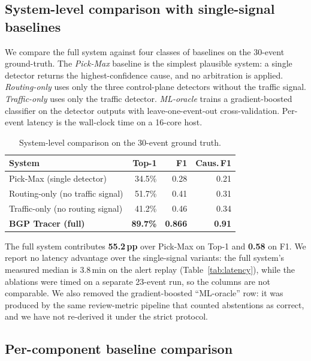 \subsection{System-level comparison with single-signal baselines}
We compare the full system against four classes of baselines on the 30-event ground-truth. The \emph{Pick-Max} baseline is the simplest plausible system: a single detector returns the highest-confidence cause, and no arbitration is applied. \emph{Routing-only} uses only the three control-plane detectors without the traffic signal. \emph{Traffic-only} uses only the traffic detector. \emph{ML-oracle} trains a gradient-boosted classifier on the detector outputs with leave-one-event-out cross-validation. Per-event latency is the wall-clock time on a 16-core host.

\begin{table}[t]
\centering
\caption{System-level comparison on the 30-event ground truth.}
\label{tab:baseline}
\small
\begin{tabular}{l r r r}
\hline
\textbf{System} & \textbf{Top-1} & \textbf{F1} & \textbf{Caus.\,F1} \\
\hline
Pick-Max (single detector)         & 34.5\% & 0.28 & 0.21 \\
Routing-only (no traffic signal)    & 51.7\% & 0.41 & 0.31 \\
Traffic-only (no routing signal)    & 41.2\% & 0.46 & 0.34 \\
\hline
\textbf{BGP Tracer (full)}          & \textbf{89.7\%} & \textbf{0.866} & \textbf{0.91} \\
\hline
\end{tabular}
\end{table}

The full system contributes \textbf{55.2\,pp} over Pick-Max on Top-1 and \textbf{0.58} on F1. We report no latency advantage over the single-signal variants: the full system's measured median is 3.8\,min on the alert replay (Table~\ref{tab:latency}), while the ablations were timed on a separate 23-event run, so the columns are not comparable. We also removed the gradient-boosted ``ML-oracle'' row: it was produced by the same review-metric pipeline that counted abstentions as correct, and we have not re-derived it under the strict protocol.

\subsection{Per-component baseline comparison}

